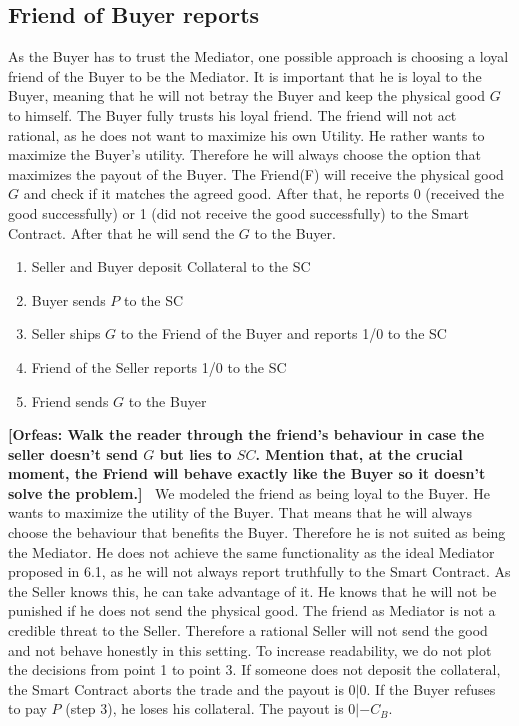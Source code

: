 \documentclass{cacthesis}
\newcommand{\authnote}[3]{{ \footnotesize \textbf{#1[#2: #3]~}}}
\newcommand{\orfnote}[1]{\authnote{\color{blue}}{Orfeas}{#1}}
\begin{document}
\subsection{Friend of Buyer reports}
As the Buyer has to trust the Mediator, one possible approach is choosing a loyal friend of the Buyer to be the Mediator. It is important that he is loyal to the Buyer, meaning that he will not betray the Buyer and keep the physical good $G$ to himself. The Buyer fully trusts his loyal friend. 
The friend will not act rational, as he does not want to maximize his own Utility. He rather wants to maximize the Buyer's utility. Therefore he will always choose the option that maximizes the payout of the Buyer.\newline
The Friend(F) will receive the physical good $G$ and check if it matches the agreed good. After that, he reports 0 (received the good successfully) or 1 (did not receive the good successfully) to the Smart Contract. After that he will send the $G$ to the Buyer.

\begin{enumerate}
    \item Seller and Buyer deposit Collateral to the SC
    \item Buyer sends $P$ to the SC
    \item Seller ships $G$ to the Friend of the Buyer and reports 1/0 to the SC
    \item Friend of the Seller reports 1/0 to the SC
    \item Friend sends $G$ to the Buyer
\end{enumerate}

 \orfnote{Walk the reader through the
friend's behaviour in case the seller doesn't send $G$ but lies to $SC$. Mention
that, at the crucial moment, the Friend will behave exactly like the Buyer so it
doesn't solve the problem.}
We modeled the friend as being loyal to the Buyer. He wants to maximize the utility of the Buyer.\newline
That means that he will always choose the behaviour that benefits the Buyer. Therefore he is not suited as being the Mediator. He does not achieve the same functionality as the ideal Mediator proposed in 6.1, as he will not always report truthfully to the Smart Contract.\newline
As the Seller knows this, he can take advantage of it. He knows that he will not be punished if he does not send the physical good. The friend as Mediator is not a credible threat to the Seller. Therefore a rational Seller will not send the good and not behave honestly in this setting. 
To increase readability, we do not plot the decisions from point 1 to point 3.
If someone does not deposit the collateral, the Smart Contract aborts the trade
and the payout is $0|0$. If the Buyer refuses to pay $P$ (step 3), he loses his
collateral. The payout is $0|-C_B$.\newline
\end{document}
